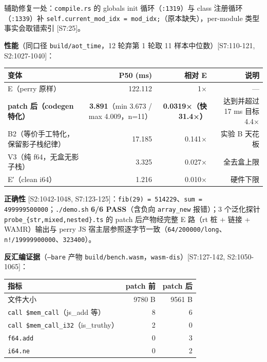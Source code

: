 \documentclass[11pt, a4paper]{article}
\begin{document}
辅助修复一处：\texttt{compile.rs} 的 globals init 循环（\texttt{:1319}）与 class 注册循环（\texttt{:1339}）补 \texttt{self.current\_mod\_idx = mod\_idx;}（原本缺失），per-module 类型事实会取错索引 [S7:25]。


\textbf{性能}（同口径 \texttt{build/aot\_time}，12 轮弃第 1 轮取 11 样本中位数）[S7:110-121, S2:1027-1040]：


\begin{center}\small\begin{tabular}{lrrr}
\toprule
变体 & P50 (ms) & 相对 E & 说明 \\
\midrule
E（perry 原样） & 122.112 & 1× & — \\
\textbf{patch 后（codegen 特化）} & \textbf{3.891}（min 3.673 / max 4.009，n=11） & \textbf{0.0319×（快 31.4×）} & 达到并超过 17 ms 目标 4.4× \\
B2（等价手工特化，保留影子栈纪律） & 17.185 & 0.141× & 实验 B 天花板 \\
V3（纯 f64，无盒无影子栈） & 3.325 & 0.027× & 全去盒上限 \\
E′（clean i64） & 1.216 & 0.010× & 硬件下限 \\
\bottomrule
\end{tabular}\end{center}


\textbf{正确性} [S2:1042-1048, S7:123-125]：\texttt{fib(29) = 514229}、\texttt{sum = 499999500000}；\texttt{./demo.sh} \textbf{6/6 PASS}（含负向 \texttt{array\_new} 报错）；3 个泛化探针 \texttt{probe\_\{str,mixed,nested\}.ts} 的 patch 后产物经完整 E 路（rt 桩 + 链接 + WAMR）输出与 perry JS 宿主层参照逐字节一致（\texttt{64/200000/long}、\texttt{n!/19999900000}、\texttt{323400}）。


\textbf{反汇编证据}（\texttt{--bare} 产物 \texttt{build/bench.wasm}，\texttt{wasm-dis}）[S7:127-142, S2:1050-1065]：


\begin{center}\small\begin{tabular}{lrr}
\toprule
指标 & patch 前 & patch 后 \\
\midrule
文件大小 & 9780 B & 9561 B \\
\texttt{call \$mem\_call}（js\_add 等） & 8 & 6 \\
\texttt{call \$mem\_call\_i32}（is\_truthy） & 2 & 0 \\
\texttt{f64.add} & 0 & 3 \\
\texttt{i64.ne} & 0 & 2 \\
\bottomrule
\end{tabular}\end{center}
\end{document}
